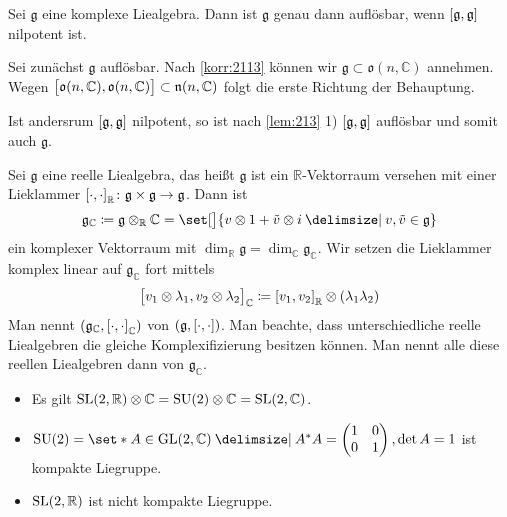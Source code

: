 \begin{korollar}[label=korr:2114,{name=[Charakterisierung von Auflösbarkeit komplexer Liealgebren]}]
	Sei $\mathfrak{g}$ eine komplexe Liealgebra.
	Dann ist $\mathfrak{g}$ genau dann auflösbar, wenn $\benbrace*{\mathfrak{g},\mathfrak{g}}$ nilpotent ist.
\end{korollar}
\begin{beweis}
	Sei zunächst $\mathfrak{g}$ auflösbar.
	Nach \autoref{korr:2113} können wir $\mathfrak{g} \subset \mathfrak{o}(n,\mathbb{C})$ annehmen.
	Wegen $\benbrace[\big]{\mathfrak{o}(n,\mathbb{C}), \mathfrak{o}(n,\mathbb{C})} \subset \mathfrak{n}(n,\mathbb{C})$ folgt die erste Richtung der Behauptung.
	
	Ist andersrum $\benbrace*{\mathfrak{g},\mathfrak{g}}$ nilpotent, so ist nach \autoref{lem:213} 1) $\benbrace*{\mathfrak{g},\mathfrak{g}}$ auflösbar und somit auch $\mathfrak{g}$.
\end{beweis}

\begin{exkurs*}[name={Komplexifizierung}]
	Sei $\mathfrak{g}$ eine reelle Liealgebra, das heißt $\mathfrak{g}$ ist ein $\mathbb{R}$-Vektorraum versehen mit einer Lieklammer $\benbrace*{\cdot ,\cdot }_\mathbb{R} \colon \mathfrak{g} \times \mathfrak{g} \to \mathfrak{g}$.
	Dann ist 
	\[
		\mathfrak{g}_\mathbb{C} \coloneqq \mathfrak{g} \otimes_\mathbb{R} \mathbb{C} = \set[\big]{v \otimes 1 + \tilde{v} \otimes i \given v , \tilde{v} \in \mathfrak{g}}
	\]
	ein komplexer Vektorraum mit $\dim_\mathbb{R} \mathfrak{g} = \dim_\mathbb{C} \mathfrak{g}_\mathbb{C}$.
	Wir setzen die Lieklammer komplex linear auf $\mathfrak{g}_\mathbb{C}$ fort mittels
	\[
		\benbrace[\big]{v_1 \otimes \lambda_1, v_2 \otimes \lambda_2}_\mathbb{C} \coloneqq \benbrace*{v_1,v_2}_\mathbb{R} \otimes (\lambda_1 \lambda_2)
	\]
	Man nennt $\enbrace*{\mathfrak{g}_\mathbb{C}, \benbrace*{\cdot ,\cdot }_\mathbb{C}}$  von $\enbrace*{\mathfrak{g}, \benbrace*{\cdot ,\cdot }}$.
	Man beachte, dass unterschiedliche reelle Liealgebren die gleiche Komplexifizierung besitzen können. 
	Man nennt alle diese reellen Liealgebren dann  von $\mathfrak{g}_\mathbb{C}$.
\end{exkurs*}

\begin{beispiel*}[{name=[Komplexifizierungen]}]
	\begin{itemize}
		\item Es gilt $\SL(2,\mathbb{R}) \otimes \mathbb{C} = \SU(2) \otimes \mathbb{C} = \SL(2,\mathbb{C})$.
		\item $\SU(2) = \set*{A \in \GL(2,\mathbb{C}) \given A^* A = \begin{pmatrix}
			1 & 0 \\ 0 & 1
		\end{pmatrix}, \det A = 1}$ ist kompakte Liegruppe.
		\item $\SL(2,\mathbb{R})$ ist nicht kompakte Liegruppe.
	\end{itemize}
\end{beispiel*}

